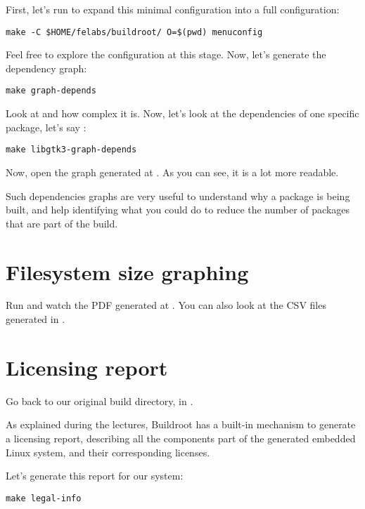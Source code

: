 First, let's run  to expand this minimal
configuration into a full configuration:

\begin{verbatim}
make -C $HOME/felabs/buildroot/ O=$(pwd) menuconfig
\end{verbatim}

Feel free to explore the configuration at this stage. Now, let's
generate the dependency graph:

\begin{verbatim}
make graph-depends
\end{verbatim}

Look at  and how complex it is. Now,
let's look at the dependencies of one specific package, let's say
:

\begin{verbatim}
make libgtk3-graph-depends
\end{verbatim}

Now, open the graph generated at
. As you can see, it is a lot
more readable.

Such dependencies graphs are very useful to understand why a package
is being built, and help identifying what you could do to reduce the
number of packages that are part of the build.

\section{Filesystem size graphing}

Run  and watch the PDF generated at
. You can also look at the CSV
files generated in .

\section{Licensing report}

Go back to our original build directory, in
.

As explained during the lectures, Buildroot has a built-in mechanism
to generate a licensing report, describing all the components part of
the generated embedded Linux system, and their corresponding licenses.

Let's generate this report for our system:

\begin{verbatim}
make legal-info
\end{verbatim}

